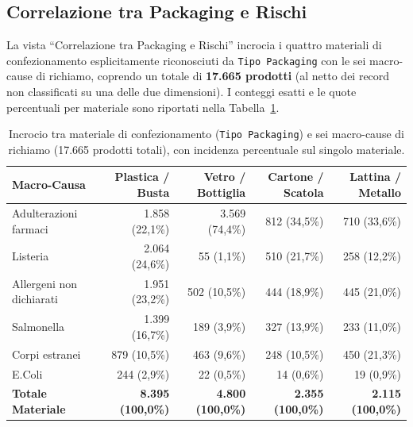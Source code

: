 \subsection{Correlazione tra Packaging e Rischi}

La vista ``Correlazione tra Packaging e Rischi'' incrocia i quattro materiali di confezionamento esplicitamente riconosciuti da \texttt{Tipo Packaging} con le sei macro-cause di richiamo, coprendo un totale di \textbf{17.665 prodotti} (al netto dei record non classificati su una delle due dimensioni). I conteggi esatti e le quote percentuali per materiale sono riportati nella Tabella~\ref{tab:tableau_packaging}.

\begin{table}[htbp]
\centering
\caption{Incrocio tra materiale di confezionamento (\texttt{Tipo Packaging}) e sei macro-cause di richiamo (17.665 prodotti totali), con incidenza percentuale sul singolo materiale.}
\label{tab:tableau_packaging}
{\small
\begin{tabularx}{\textwidth}{@{}Xrrrr@{}}
\toprule
\textbf{Macro-Causa} & \textbf{Plastica / Busta} & \textbf{Vetro / Bottiglia} & \textbf{Cartone / Scatola} & \textbf{Lattina / Metallo} \\
\midrule
Adulterazioni farmaci & 1.858 (22,1\%) & 3.569 (74,4\%) & 812 (34,5\%) & 710 (33,6\%) \\
Listeria & 2.064 (24,6\%) & 55 (1,1\%) & 510 (21,7\%) & 258 (12,2\%) \\
Allergeni non dichiarati & 1.951 (23,2\%) & 502 (10,5\%) & 444 (18,9\%) & 445 (21,0\%) \\
Salmonella & 1.399 (16,7\%) & 189 (3,9\%) & 327 (13,9\%) & 233 (11,0\%) \\
Corpi estranei & 879 (10,5\%) & 463 (9,6\%) & 248 (10,5\%) & 450 (21,3\%) \\
E.Coli & 244 (2,9\%) & 22 (0,5\%) & 14 (0,6\%) & 19 (0,9\%) \\
\midrule
\textbf{Totale Materiale} & \textbf{8.395 (100,0\%)} & \textbf{4.800 (100,0\%)} & \textbf{2.355 (100,0\%)} & \textbf{2.115 (100,0\%)} \\
\bottomrule
\end{tabularx}
}
\end{table}


